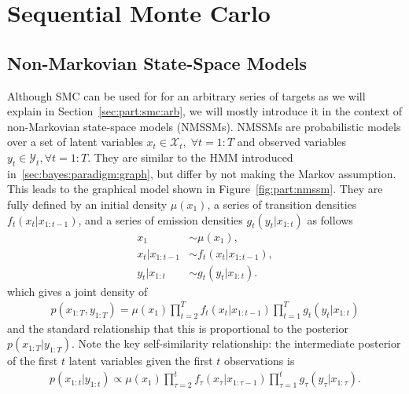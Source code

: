 
\section{Sequential Monte Carlo}
\label{sec:part:smc}

\subsection{Non-Markovian State-Space Models}
\label{sec:part:smc:nmssm}

Although SMC can be used for for an arbitrary series of targets as we will explain
in Section~\ref{sec:part:smc:arb}, we will mostly introduce it in the context of non-Markovian state-space
models (NMSSMs).  NMSSMs are probabilistic models over a set of latent variables 
$x_t \in \mathcal{X}_t, \; \forall t = 1:T$
and observed variables $y_t \in \mathcal{Y}_t, \forall t = 1:T$.  
They are similar to
the HMM introduced in~\ref{sec:bayes:paradigm:graph}, but differ by not
making the Markov assumption.  This leads to the graphical model shown in Figure~\ref{fig:part:nmssm}.
They are fully defined by an initial density $\mu (x_1)$,
a series of transition densities $f_{t} (x_t | x_{1:t-1})$, and a series of
emission densities $g_{t} (y_t | x_{1:t})$ as follows
\begin{subequations}
\label{eq:part:ssm}
\begin{align}
x_1 &\sim \mu(x_1), \\
x_t | x_{1:t - 1} &\sim f_{t}(x_t | x_{1:t - 1}), \\
y_t | x_{1:t} &\sim g_{t}(y_t | x_{1:t}).
\end{align}
\end{subequations}
which gives a joint density of
\begin{align}
\label{eq:part:jointdistribution}
p(x_{1:T}, y_{1:T}) = \mu(x_1) \prod_{t = 2}^T f_{t}(x_t | x_{1:t - 1}) \prod_{t = 1}^T g_{t}(y_t | x_{1:t})
\end{align}
and the standard relationship that this is proportional to the posterior
$p(x_{1:T} | y_{1:T})$.  Note the
key self-similarity relationship: the intermediate posterior of the first $t$ latent variables
given the first $t$ observations is
\begin{align*}
p(x_{1:t} | y_{1:t}) \propto \mu(x_1) \prod_{\tau = 2}^t f_{\tau}(x_{\tau} | x_{1:\tau - 1}) \prod_{\tau = 1}^t g_{\tau}(y_{\tau} | x_{1:\tau}).
\end{align*}
